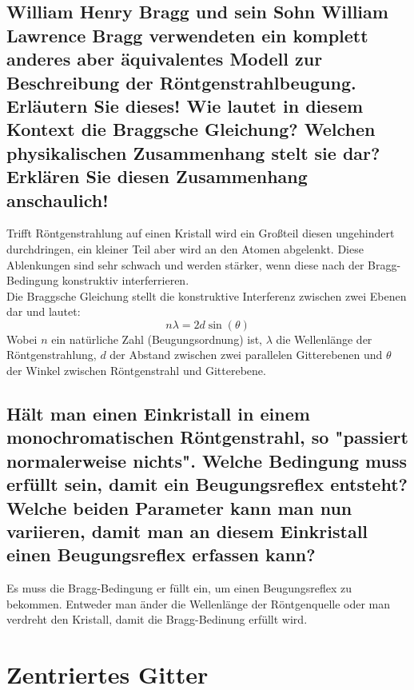 \subsection*{William Henry Bragg und sein Sohn William Lawrence Bragg verwendeten ein komplett anderes aber äquivalentes Modell zur Beschreibung der Röntgenstrahlbeugung. Erläutern Sie dieses! Wie lautet in diesem Kontext die Braggsche Gleichung? Welchen physikalischen Zusammenhang stelt sie dar? Erklären Sie diesen Zusammenhang anschaulich!}
Trifft Röntgenstrahlung auf einen Kristall wird ein Großteil diesen ungehindert durchdringen, ein kleiner Teil aber wird an den Atomen abgelenkt.
Diese Ablenkungen sind sehr schwach und werden stärker, wenn diese nach der Bragg-Bedingung konstruktiv interferrieren.\\
Die Braggsche Gleichung stellt die konstruktive Interferenz zwischen zwei Ebenen dar und lautet:
\begin{equation}
    n\lambda=2d\sin\left(\theta\right)
\end{equation}
Wobei $n$ ein natürliche Zahl (Beugungsordnung) ist, $\lambda$ die Wellenlänge der Röntgenstrahlung, $d$ der Abstand zwischen zwei parallelen Gitterebenen und $\theta$ der Winkel zwischen Röntgenstrahl und Gitterebene.
\subsection*{Hält man einen Einkristall in einem monochromatischen Röntgenstrahl, so "passiert normalerweise nichts". Welche Bedingung muss erfüllt sein, damit ein Beugungsreflex entsteht? Welche beiden Parameter kann man nun variieren, damit man an diesem Einkristall einen Beugungsreflex erfassen kann?}
Es muss die Bragg-Bedingung er füllt ein, um einen Beugungsreflex zu bekommen.
Entweder man änder die Wellenlänge der Röntgenquelle oder man verdreht den Kristall, damit die Bragg-Bedinung erfüllt wird.
\section{Zentriertes Gitter}
